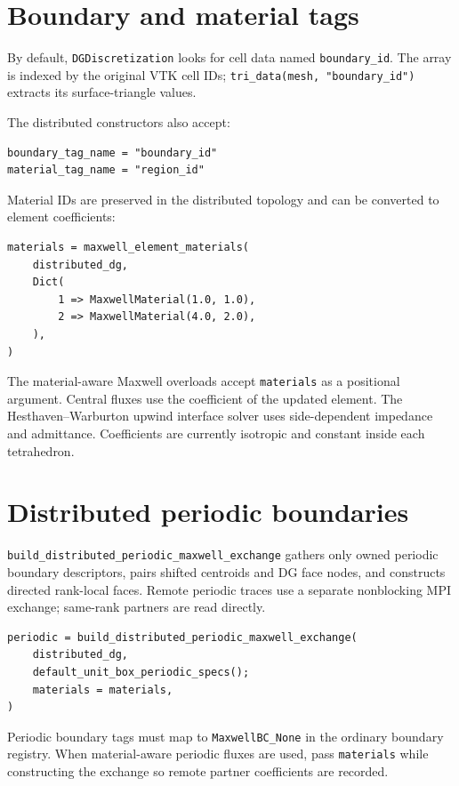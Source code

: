 \documentclass[11pt,oneside]{book}
\newcommand{\code}[1]{\texttt{#1}}
\begin{document}
\section{Boundary and material tags}

By default, \code{DGDiscretization} looks for cell data named
\code{boundary\_id}. The array is indexed by the original VTK cell IDs;
\code{tri\_data(mesh, "boundary\_id")} extracts its surface-triangle values.

The distributed constructors also accept:

\begin{lstlisting}
boundary_tag_name = "boundary_id"
material_tag_name = "region_id"
\end{lstlisting}

Material IDs are preserved in the distributed topology and can be converted
to element coefficients:

\begin{lstlisting}
materials = maxwell_element_materials(
    distributed_dg,
    Dict(
        1 => MaxwellMaterial(1.0, 1.0),
        2 => MaxwellMaterial(4.0, 2.0),
    ),
)
\end{lstlisting}

The material-aware Maxwell overloads accept \code{materials} as a positional
argument. Central fluxes use the coefficient of the updated element. The
Hesthaven--Warburton upwind interface solver uses side-dependent impedance and
admittance. Coefficients are currently isotropic and constant inside each
tetrahedron.

\section{Distributed periodic boundaries}

\code{build\_distributed\_periodic\_maxwell\_exchange} gathers only owned
periodic boundary descriptors, pairs shifted centroids and DG face nodes, and
constructs directed rank-local faces. Remote periodic traces use a separate
nonblocking MPI exchange; same-rank partners are read directly.

\begin{lstlisting}
periodic = build_distributed_periodic_maxwell_exchange(
    distributed_dg,
    default_unit_box_periodic_specs();
    materials = materials,
)
\end{lstlisting}

Periodic boundary tags must map to \code{MaxwellBC\_None} in the ordinary
boundary registry. When material-aware periodic fluxes are used, pass
\code{materials} while constructing the exchange so remote partner
coefficients are recorded.
\end{document}
